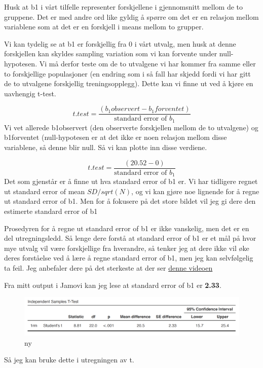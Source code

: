\documentclass[
]{book}
\begin{document}
Husk at b1 i vårt tilfelle representer forskjellene i gjennomsnitt mellom de to gruppene. Det er med andre ord like gyldig å spørre om det er en relasjon mellom variablene som at det er en forskjell i means mellom to grupper.

Vi kan tydelig se at b1 er forskjellig fra 0 i vårt utvalg, men husk at denne forskjellen kan skyldes sampling variation som vi kan forvente under null-hypotesen. Vi må derfor teste om de to utvalgene vi har kommer fra samme eller to forskjellige populasjoner (en endring som i så fall har skjedd fordi vi har gitt de to utvalgene forskjellig treningsopplegg). Dette kan vi finne ut ved å kjøre en uavhengig t-test.

\[
t.test = \frac{(b_1observert - b_1forventet)}{\text{standard error of } b_1}
\]
Vi vet allerede b1observert (den observerte forskjellen mellom de to utvalgene) og b1forventet (null-hypotesen er at det ikke er noen relasjon mellom disse variablene, så denne blir null. Så vi kan plotte inn disse verdiene.

\[
t.test = \frac{(20.52 - 0)}{\text{standard error of } b_1}
\]
Det som gjenstår er å finne ut hva standard error of b1 er. Vi har tidligere regnet ut standard error of mean \(SD/sqrt(N)\), og vi kan gjøre noe lignende for å regne ut standard error of b1. Men for å fokusere på det store bildet vil jeg gi dere den estimerte standard error of b1

Prosedyren for å regne ut standard error of b1 er ikke vanskelig, men det er en del utregningsledd. Så lenge dere forstå at standard error of b1 er et mål på hvor mye utvalg vil være forskjellige fra hverandre, så tenker jeg at dere ikke vil øke deres forståelse ved å lære å regne standard error of b1, men jeg kan selvfølgelig ta feil. Jeg anbefaler dere på det sterkeste at der ser \href{https://www.youtube.com/watch?v=3L9ZMdzJyyI}{denne videoen}

Fra mitt output i Jamovi kan jeg lese at standard error of b1 er \textbf{2.33}.

\begin{figure}
\centering
\includegraphics{output.png}
\caption{ny}
\end{figure}

Så jeg kan bruke dette i utregningen av t.
\end{document}
